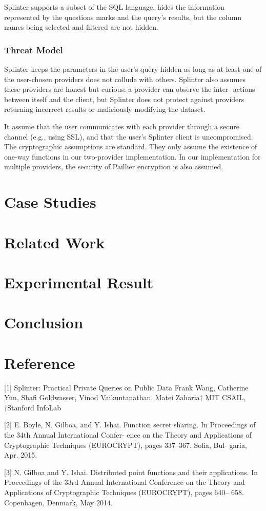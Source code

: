 \documentclass[12pt,a4paper]{article}
\begin{document}
\begin{multicols}{2}
Splinter supports a subset of the SQL language, 
hides the information represented by the questions 
marks and the query’s results, but the column names 
being selected and filtered are not hidden.
\subsubsection{Threat Model}
Splinter keeps the parameters in the user’s query 
hidden as long as at least one of the user-chosen 
providers does not collude with others. Splinter 
also assumes these providers are honest but 
curious: a provider can observe the inter- actions 
between itself and the client, but Splinter does 
not protect against providers returning incorrect 
results or maliciously modifying the dataset.

It assume that the user communicates with each 
provider through a secure channel (e.g., using 
SSL), and that the user’s Splinter client is 
uncompromised. The cryptographic assumptions are 
standard. They only assume the existence of one-way 
functions in our two-provider implementation. In 
our implementation for multiple providers, the 
security of Paillier encryption is also 
assumed.

\section{Case Studies}
\section{Related Work}
\section{Experimental Result}
\section{Conclusion}

\section{Reference}
[1] Splinter: Practical Private Queries on Public 
Data Frank Wang, Catherine Yun, Shafi Goldwasser, 
Vinod Vaikuntanathan, Matei Zaharia† MIT CSAIL, 
†Stanford InfoLab

[2] E. Boyle, N. Gilboa, and Y. Ishai. Function 
secret sharing. In Proceedings of the 34th Annual 
International Confer- ence on the Theory and 
Applications of Cryptographic Techniques 
(EUROCRYPT), pages 337–367. Sofia, Bul- garia, Apr. 
2015.

[3] N. Gilboa and Y. Ishai. Distributed point 
functions and their applications. In Proceedings of 
the 33rd Annual International Conference on the 
Theory and Applications of Cryptographic Techniques 
(EUROCRYPT), pages 640– 658. Copenhagen, Denmark, 
May 2014.



\end{multicols}
\end{document}
